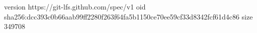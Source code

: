 version https://git-lfs.github.com/spec/v1
oid sha256:dcc393c0b66aab99ff2280f263f64fa5b1150ce70ee59cf33d8342fcf61d4c86
size 349708
